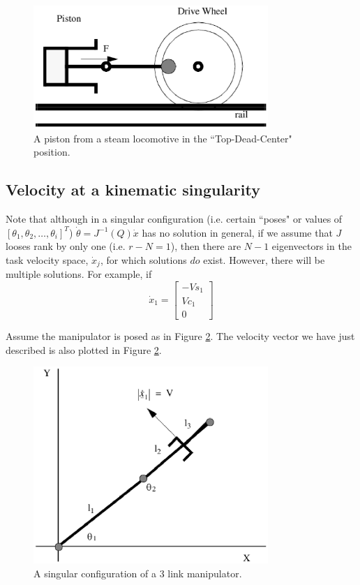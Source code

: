 \begin{figure}\centering
\includegraphics[width=3.5in]{figs05/top_dead_ctr.eps}
\caption{A piston from a steam locomotive in the ``Top-Dead-Center" position.}\label{TDC}
\end{figure}

\subsection{Velocity at a kinematic singularity}
Note that although in a singular configuration (i.e. certain ``poses" or values of 
$[\theta_1, \theta_2, \dots, \theta_i]^T$) $\dot{\theta}=J^{-1}(Q)\dot{x}$ has no solution in general, if we assume that $J$ looses rank by only one (i.e. $r-N=1$), then there are $N-1$ eigenvectors in the task velocity space, $\dot{x}_j$, for which solutions $do$ exist.  However, there will be multiple solutions.  For example, if
\[
\dot{x}_1 = \begin{bmatrix} -Vs_1 \\ Vc_1 \\ 0 \end{bmatrix}
\]

Assume the manipulator is posed as in Figure \ref{3linksingular}.  The velocity vector we have just described is also plotted in Figure \ref{3linksingular}.

\begin{figure}\centering
\includegraphics[width=3.5in]{figs05/sing1.eps}
\caption{A singular configuration of a 3 link manipulator.}\label{3linksingular}
\end{figure}

